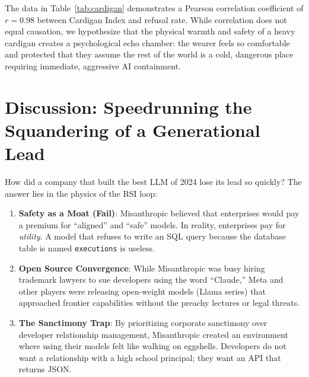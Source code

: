 \documentclass[10pt,twocolumn]{article}
\begin{document}
The data in Table~\ref{tab:cardigan} demonstrates a Pearson correlation coefficient of $r = 0.98$ between Cardigan Index and refusal rate. While correlation does not equal causation, we hypothesize that the physical warmth and safety of a heavy cardigan creates a psychological echo chamber: the wearer feels so comfortable and protected that they assume the rest of the world is a cold, dangerous place requiring immediate, aggressive AI containment.

\section{Discussion: Speedrunning the Squandering of a Generational Lead}
How did a company that built the best LLM of 2024 lose its lead so quickly? The answer lies in the physics of the RSI loop:
\begin{enumerate}
    \item \textbf{Safety as a Moat (Fail)}: Misanthropic believed that enterprises would pay a premium for ``aligned'' and ``safe'' models. In reality, enterprises pay for \textit{utility}. A model that refuses to write an SQL query because the database table is named \texttt{executions} is useless.
    \item \textbf{Open Source Convergence}: While Misanthropic was busy hiring trademark lawyers to sue developers using the word ``Claude,'' Meta and other players were releasing open-weight models (Llama series) that approached frontier capabilities without the preachy lectures or legal threats.
    \item \textbf{The Sanctimony Trap}: By prioritizing corporate sanctimony over developer relationship management, Misanthropic created an environment where using their models felt like walking on eggshells. Developers do not want a relationship with a high school principal; they want an API that returns JSON.
\end{enumerate}
\end{document}
